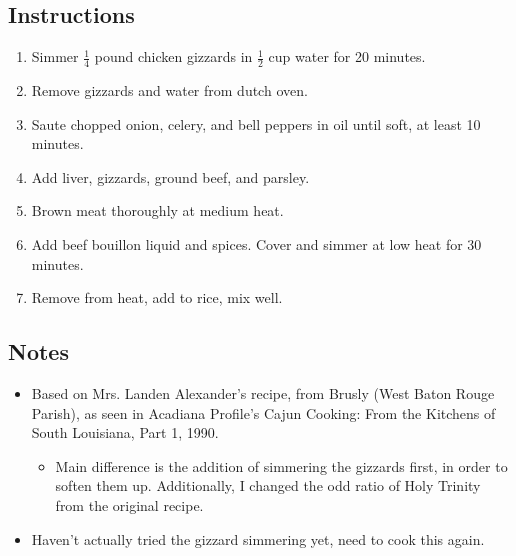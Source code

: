 \begin{multicols}{2}
\subsection*{Instructions}
\begin{enumerate}
    \item Simmer \( \frac{1}{4} \) pound chicken gizzards in \( \frac{1}{2} \) cup water for 20 minutes.
    \item Remove gizzards and water from dutch oven.
    \item Saute chopped onion, celery, and bell peppers in oil until soft, at least 10 minutes.
    \item Add liver, gizzards, ground beef, and parsley.
    \item Brown meat thoroughly at medium heat.
    \item Add beef bouillon liquid and spices. Cover and simmer at low heat for 30 minutes.
    \item Remove from heat, add to rice, mix well.

\end{enumerate}

\subsection*{Notes}
\begin{itemize}
    \item Based on Mrs. Landen Alexander’s recipe, from Brusly (West Baton Rouge Parish), as seen in Acadiana Profile’s Cajun Cooking: From the Kitchens of South Louisiana, Part 1, 1990.
    \begin{itemize}
        \item Main difference is the addition of simmering the gizzards first, in order to soften them up. Additionally, I changed the odd ratio of Holy Trinity from the original recipe.
    \end{itemize}
    \item Haven’t actually tried the gizzard simmering yet, need to cook this again.
\end{itemize}
\end{multicols}
\clearpage